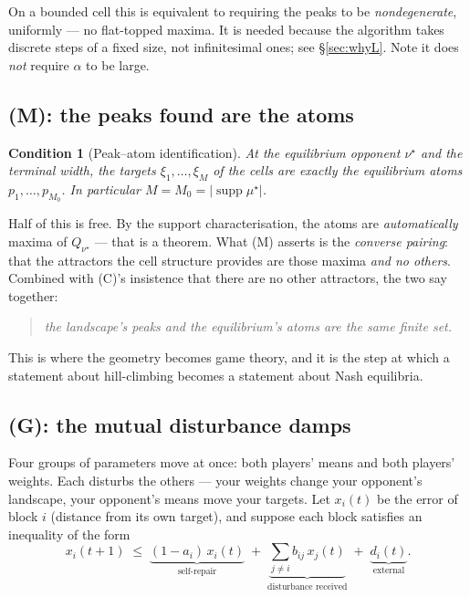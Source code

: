 \documentclass[11pt]{article}
\newtheorem{condition}{Condition}
\theoremstyle{definition}
\DeclareMathOperator{\supp}{supp}
\begin{document}
\noindent
On a bounded cell this is equivalent to requiring the peaks to be
\emph{nondegenerate}, uniformly --- no flat-topped maxima. It is needed because
the algorithm takes discrete steps of a fixed size, not infinitesimal ones; see
\S\ref{sec:whyL}. Note it does \emph{not} require $\alpha$ to be large.

\subsection*{(M): the peaks found are the atoms}

\begin{condition}[Peak--atom identification]\label{cond:M}
At the equilibrium opponent $\nu^\star$ and the terminal width, the targets
$\xi_1,\dots,\xi_M$ of the cells are exactly the equilibrium atoms
$p_1,\dots,p_{M_0}$. In particular $M = M_0 = |\supp \mu^\star|$.
\end{condition}

\noindent
Half of this is free. By the support characterisation, the atoms are
\emph{automatically} maxima of $Q_{\nu^\star}$ --- that is a theorem. What (M)
asserts is the \emph{converse pairing}: that the attractors the cell structure
provides are those maxima \emph{and no others}. Combined with (C)'s insistence
that there are no other attractors, the two say together:
\begin{quote}
\emph{the landscape's peaks and the equilibrium's atoms are the same finite set.}
\end{quote}
This is where the geometry becomes game theory, and it is the step at which a
statement about hill-climbing becomes a statement about Nash equilibria.

\subsection*{(G): the mutual disturbance damps}

Four groups of parameters move at once: both players' means and both players'
weights. Each disturbs the others --- your weights change your opponent's
landscape, your opponent's means move your targets. Let $x_i(t)$ be the error of
block $i$ (distance from its own target), and suppose each block satisfies an
inequality of the form
\begin{equation}\label{eq:blocks}
  x_i(t+1) \;\le\; \underbrace{(1 - a_i)\,x_i(t)}_{\text{self-repair}}
  \;+\; \underbrace{\textstyle\sum_{j \ne i} b_{ij}\,x_j(t)}_{\text{disturbance received}}
  \;+\; \underbrace{d_i(t)}_{\text{external}} .
\end{equation}
\end{document}
